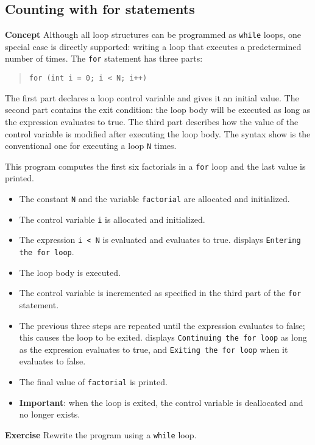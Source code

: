 \subsection{Counting with for statements}\label{control.06}

\textbf{Concept} Although all loop structures can be programmed as \texttt{while} loops,
one special case is directly supported: writing a loop that executes a predetermined number
of times. The \texttt{for} statement has three parts:
\begin{quote}
\texttt{for (int i = 0; i < N; i++)}
\end{quote}
The first part declares a loop control variable and gives it an initial value.
The second part contains the exit condition: the loop body will be executed
as long as the expression evaluates to true. The third part describes how
the value of the control variable is modified after executing the loop body.
The syntax show is the conventional one for executing a loop \texttt{N} times.


This program computes the first six factorials in a \texttt{for} loop
and the last value is printed.

\begin{itemize}
\item The constant \texttt{N} and the variable \texttt{factorial} are allocated and initialized.
\item The control variable \texttt{i} is allocated and initialized.
\item The expression \texttt{i < N} is evaluated and evaluates to true.
\jel{} displays \texttt{Entering the for loop}.
\item The loop body is executed. 
\item The control variable is incremented as specified in the third part of the
\texttt{for} statement.
\item The previous three steps are repeated until the expression evaluates to false;
this causes the loop to be exited. \jel{} displays \texttt{Continuing the for loop}
as long as the expression evaluates to true, and \texttt{Exiting the for loop} when
it evaluates to false.
\item The final value of \texttt{factorial} is printed. 
\item \textbf{Important}: when the loop is exited, the control variable is
deallocated and no longer exists.
\end{itemize}

\textbf{Exercise} Rewrite the program using a \texttt{while} loop.

